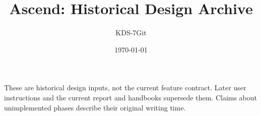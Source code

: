 \documentclass[11pt,a4paper]{article}
\title{Ascend: Historical Design Archive}
\author{KDS-7Git}
\date{\today}
\begin{document}
\maketitle
These are historical design inputs, not the current feature contract. Later user instructions and the current report and handbooks supersede them. Claims about unimplemented phases describe their original writing time.
\tableofcontents
\newpage







\end{document}
